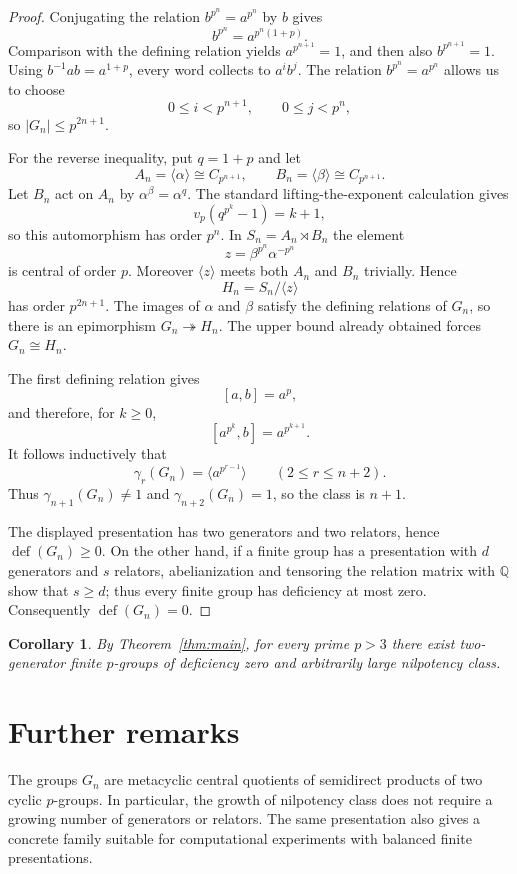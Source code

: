 \documentclass[11pt]{amsart}
\newtheorem{corollary}[theorem]{Corollary}
\theoremstyle{definition}
\newcommand{\Q}{\mathbb Q}
\begin{document}
\begin{proof}
Conjugating the relation $b^{p^n}=a^{p^n}$ by $b$ gives
\[
 b^{p^n}=a^{p^n(1+p)}.
\]
Comparison with the defining relation yields $a^{p^{n+1}}=1$, and then also $b^{p^{n+1}}=1$.  Using $b^{-1}ab=a^{1+p}$, every word collects to $a^ib^j$.  The relation $b^{p^n}=a^{p^n}$ allows us to choose
\[
 0\leq i<p^{n+1},\qquad 0\leq j<p^n,
\]
so $|G_n|\leq p^{2n+1}$.

For the reverse inequality, put $q=1+p$ and let
\[
 A_n=\langle\alpha\rangle\cong C_{p^{n+1}},\qquad
 B_n=\langle\beta\rangle\cong C_{p^{n+1}}.
\]
Let $B_n$ act on $A_n$ by $\alpha^\beta=\alpha^q$.  The standard lifting-the-exponent calculation gives
\[
 v_p(q^{p^k}-1)=k+1,
\]
so this automorphism has order $p^n$.  In $S_n=A_n\rtimes B_n$ the element
\[
 z=\beta^{p^n}\alpha^{-p^n}
\]
is central of order $p$.  Moreover $\langle z\rangle$ meets both $A_n$ and $B_n$ trivially.  Hence
\[
 H_n=S_n/\langle z\rangle
\]
has order $p^{2n+1}$.  The images of $\alpha$ and $\beta$ satisfy the defining relations of $G_n$, so there is an epimorphism $G_n\twoheadrightarrow H_n$.  The upper bound already obtained forces $G_n\cong H_n$.

The first defining relation gives
\[
 [a,b]=a^p,
\]
and therefore, for $k\geq0$,
\[
 [a^{p^k},b]=a^{p^{k+1}}.
\]
It follows inductively that
\[
 \gamma_r(G_n)=\langle a^{p^{r-1}}\rangle\qquad(2\leq r\leq n+2).
\]
Thus $\gamma_{n+1}(G_n)\neq1$ and $\gamma_{n+2}(G_n)=1$, so the class is $n+1$.

The displayed presentation has two generators and two relators, hence $\operatorname{def}(G_n)\geq0$.  On the other hand, if a finite group has a presentation with $d$ generators and $s$ relators, abelianization and tensoring the relation matrix with $\Q$ show that $s\geq d$; thus every finite group has deficiency at most zero.  Consequently $\operatorname{def}(G_n)=0$.
\end{proof}

\begin{corollary}\label{cor:unbounded-class}
By Theorem~\ref{thm:main}, for every prime $p>3$ there exist two-generator finite $p$-groups of deficiency zero and arbitrarily large nilpotency class.
\end{corollary}

\section{Further remarks}
The groups $G_n$ are metacyclic central quotients of semidirect products of two cyclic $p$-groups.  In particular, the growth of nilpotency class does not require a growing number of generators or relators.  The same presentation also gives a concrete family suitable for computational experiments with balanced finite presentations.
\end{document}
